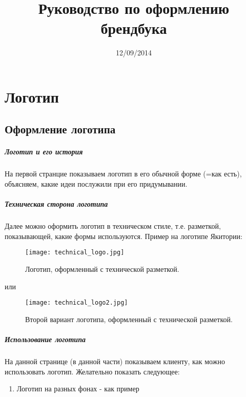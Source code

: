\documentclass[DIV=calc, paper=a4, fontsize=11pt]{scrartcl} %
\title{Руководство по оформлению брендбука}
\date{12/09/2014}
\begin{document}
\maketitle


\chapter{Логотип}

\section{Оформление логотипа}

\paragraph{Логотип и его история} На первой странцие показываем логотип в его обычной форме (=как есть), объясняем, какие идеи послужили при его придумывании.
\paragraph{Техническая сторона логотипа}
Далее можно оформить логотип в техническом стиле, т.е. разметкой, показывающей, какие формы используются. Пример на логотипе Якитории:
        \begin{figure}[ht!]
        \centering
        \texttt{[image: technical\_logo.jpg]}
        \caption{Логотип, оформленный с технической разметкой. \label{technical_logo.jpg}}
        \end{figure}
        
    или
    
    \begin{figure}[ht!]
        \centering
        \texttt{[image: technical\_logo2.jpg]}
        \caption{Второй вариант логотипа, оформленный с технической разметкой. \label{technical_logo2.jpg}}
        \end{figure}
\paragraph{Использование логотипа}
На данной странице (в данной части) показываем клиенту, как можно использовать логотип. Желательно показать следующее:
    \begin{enumerate}
        \item Логотип на разных фонах - как пример
    \end{enumerate}

        
\end{document}
